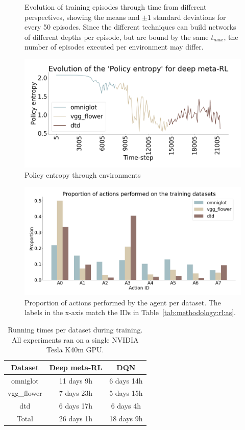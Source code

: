\begin{figure}[ht]
\begin{subfigure}{.33\textwidth}
  \caption{} 
\label{fig:results:exp1:evolution:i}
\end{subfigure}
\caption{Evolution of training episodes through time from different perspectives, showing the means and $\pm 1$ standard deviations for every 50 episodes. Since the different techniques can build networks of different depths per episode, but are bound by the same $t_{max}$, the number of episodes executed per environment may differ.}
\label{fig:results:exp1:evolution}
\vspace{-0.5cm}
\end{figure}


\begin{figure}[ht]
\centering
    \includegraphics[width=0.65\linewidth]{imgs/chained/entropy.png}
\caption{Policy entropy through environments}
\label{fig:results:entropy}
\end{figure}

\begin{figure}[ht]
\centering
    \includegraphics[width=0.65\linewidth]{imgs/chained/actions-dist-training.png}
\caption{Proportion of actions performed by the agent per dataset. The labels in the x-axis match the IDs in Table~\ref{tab:methodology:rl:as}.}
\label{fig:results:exp1:actions}
\end{figure}


\begin{table}[ht]
\centering
\begin{tabular}{@{}ccc@{}}
\toprule
Dataset     & Deep meta-RL & DQN         \\ \midrule
omniglot    & 11 days 9h   & 6 days 14h    \\
vgg\_flower & 7 days 23h   & 5 days 15h     \\
dtd         & 6 days 17h   & 6 days 4h      \\ \midrule
Total       & 26 days 1h   & 18 days 9h    \\ \bottomrule
\end{tabular}
\caption{Running times per dataset during training. All experiments ran on a single NVIDIA Tesla K40m GPU.}
\label{tab:results:times}
\end{table}


